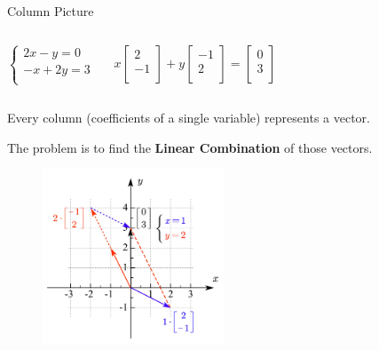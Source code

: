 \documentclass{beamer}
\begin{document}
\begin{frame}{Column Picture}
\begin{columns}
\begin{equation*}
    \begin{cases}
	2x-y=0\\
	-x+2y=3\\
\end{cases}
\end{equation*}

\vspace{-9pt}
\begin{equation*}
    x\left[ \begin{array}{c}
	2\\
	-1\\
\end{array} \right] +y\left[ \begin{array}{c}
	-1\\
	2\\
\end{array} \right] =\left[ \begin{array}{c}
	0\\
	3\\
\end{array} \right]
\end{equation*}
\end{columns}

\vspace{4pt}
Every column (coefficients of a single variable) represents a vector.

The problem is to find the \textbf{Linear Combination} of those vectors.
\vspace{-1.03pt}

\begin{figure}
    \centering
    \includegraphics[width=0.48\textwidth]{Column.jpg}
\end{figure}

\end{frame}
\end{document}
